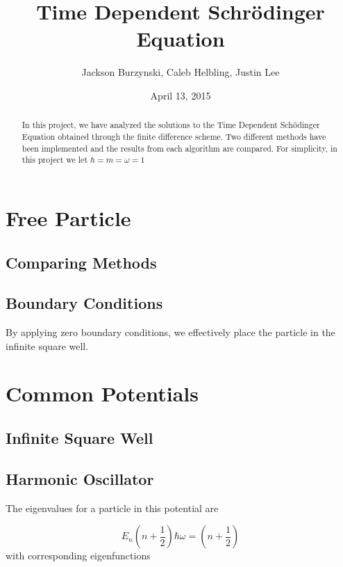 \documentclass{article}
\begin{document}
\title{Time Dependent Schr\"{o}dinger Equation}
\author{Jackson Burzynski, Caleb Helbling, Justin Lee}
\date{April 13, 2015}

\maketitle

\begin{abstract}

In this project, we have analyzed the solutions to the Time Dependent Sch\"{o}dinger Equation obtained through the finite difference scheme. Two different methods have been implemented and the results from each algorithm are compared. For simplicity, in this project we let $\hbar = m = \omega = 1$

\end{abstract}

\section{Free Particle}

\subsection{Comparing Methods}

\subsection{Boundary Conditions}

By applying zero boundary conditions, we effectively place the particle in the infinite square well.

\section{Common Potentials}

\subsection{Infinite Square Well}

\subsection{Harmonic Oscillator}

The eigenvalues for a particle in this potential are

\begin{equation}
E_n \left( n + \frac{1}{2} \right) \hbar \omega = \left( n + \frac{1}{2} \right)
\end{equation}
%
with corresponding eigenfunctions
\end{document}
